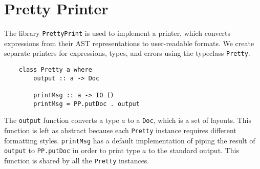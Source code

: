 \section{Pretty Printer}
The library \texttt{PrettyPrint} is used to implement a printer, which converts expressions from their AST representations to 
user-readable formats. We create separate printers for expressions, types, and errors using  
the typeclass \lstinline{Pretty}. 
\begin{lstlisting}
    class Pretty a where 
        output :: a -> Doc
        
        printMsg :: a -> IO ()
        printMsg = PP.putDoc . output
\end{lstlisting}
The \lstinline{output} function converts a type $a$ to a 
\texttt{Doc}, which is a set of layouts. This function is left as abstract because each \texttt{Pretty} instance  
requires different formatting styles. \texttt{printMsg} has a default implementation of 
piping the result of \texttt{output} to \texttt{PP.putDoc} in order to print type $a$ to the standard output. 
This function is shared by all the \texttt{Pretty} instances. 